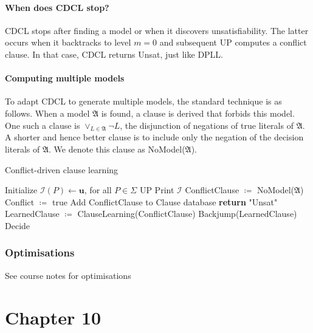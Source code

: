\documentclass[10pt,a4paper]{article}
\theoremstyle{definition}
\begin{document}
\paragraph{When does CDCL stop?} CDCL stops after finding a model or when it discovers unsatisfiability. The latter occurs when it backtracks to level $m = 0$ and subsequent UP computes a conflict clause. In that case, CDCL returns Unsat, just like DPLL.

\paragraph{Computing multiple models} To adapt CDCL to generate multiple models, the standard technique is as follows. When a model $\mathfrak{A}$ is found, a clause is derived that forbids this model. One such a clause is $\lor_{L\in\mathfrak{A}}\lnot L$, the disjunction of negations of true literals of $\mathfrak{A}$. A shorter and hence better clause is to include only the negation of the decision literals of $\mathfrak{A}$. We denote this clause as NoModel($\mathfrak{A}$).

\begin{algorithm}
\caption{Conflict-driven clause learning}
\begin{algorithmic}[1]
 
    \State Initialize $\mathcal{I}(P) \leftarrow \textbf{u}$, for all $P \in \Sigma$
    	\State UP
    		\State Print $\mathcal{I}$
    		\State ConflictClause $\coloneqq$ NoModel($\mathfrak{A}$)
    		\State Conflict $\coloneqq$ true
    		\State Add ConflictClause to Clause database
    	\EndIf
    	\State \textbf{return} "Unsat"
    	\EndIf
    	\State LearnedClause $\coloneqq$ ClauseLearning(ConflictClause)
    	\State Backjump(LearnedClause)
    	\Else {}
    	\State Decide
    	\EndIf
    \EndWhile
\EndProcedure
\end{algorithmic}
\end{algorithm}


\subsubsection{Optimisations}

See course notes for optimisations


\section{Chapter 10}
\end{document}
